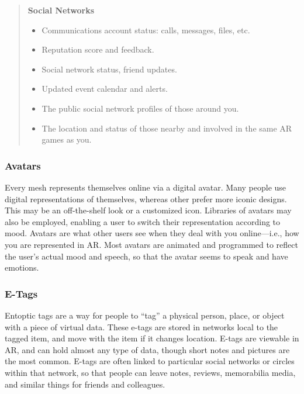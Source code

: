 \begin{quotation}
\noindent \textbf{Social Networks}
\begin{itemize}
\item Communications account status: calls, messages, files, etc.
\item Reputation score and feedback.
\item Social network status, friend updates.
\item Updated event calendar and alerts.
\item The public social network profiles of those around you.
\item The location and status of those nearby and involved in the same AR games as you.
\end{itemize}
\end{quotation}


\subsubsection{Avatars}

Every mesh represents themselves online via a digital
avatar. Many people use digital representations
of themselves, whereas other prefer more iconic 
designs. This may be an off-the-shelf look or a 
customized icon. Libraries of avatars may also be 
employed, enabling a user to switch their representation
according to mood. Avatars are what other
users see when they deal with you online—i.e., how 
you are represented in AR. Most avatars are animated
and programmed to reflect the user's actual
mood and speech, so that the avatar seems to speak 
and have emotions.

\subsubsection{E-Tags}

Entoptic tags are a way for people to ``tag'' a physical 
person, place, or object with a piece of virtual data. 
These e-tags are stored in networks local to the tagged 
item, and move with the item if it changes location. 
E-tags are viewable in AR, and can hold almost any 
type of data, though short notes and pictures are the 
most common. E-tags are often linked to particular 
social networks or circles within that network, so that 
people can leave notes, reviews, memorabilia media, 
and similar things for friends and colleagues.


